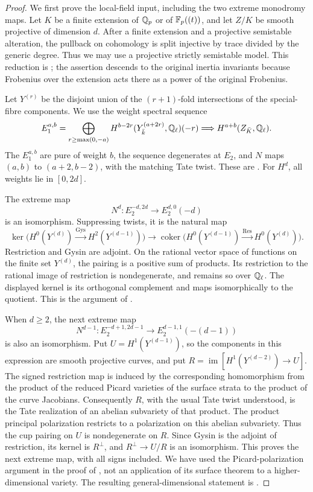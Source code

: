 \begin{proof}
We first prove the local-field input, including the two extreme
monodromy maps.  Let $K$ be a finite extension of $\mathbb Q_p$ or of
$\mathbb F_p((t))$, and let $Z/K$ be smooth projective of dimension $d$.
After a finite extension and a projective semistable alteration,
the pullback on cohomology is split injective by trace divided by
the generic degree.  Thus we may use a projective strictly
semistable model.  This reduction is
\citet[Theorem~6.5, pp.~83--86]{c_dejong1996}; the assertion
descends to the original inertia invariants because Frobenius over
the extension acts there as a power of the original Frobenius.

Let $Y^{(r)}$ be the disjoint union of the $(r+1)$-fold intersections
of the special-fibre components.  We use the weight spectral sequence
\[
 E_1^{a,b}=\bigoplus_{r\geq\max(0,-a)}
 H^{b-2r}(Y^{(a+2r)}_{\bar k},\mathbb Q_\ell)(-r)
 \Longrightarrow H^{a+b}(Z_{\bar K},\mathbb Q_\ell).
\]
The $E_1^{a,b}$ are pure of weight $b$, the sequence degenerates at
$E_2$, and $N$ maps $(a,b)$ to $(a+2,b-2)$, with the matching
Tate twist.  These are
\citet[Satz~2.10 and (2.11), pp.~40--41]{c_rapoportzink1982}.
For $H^d$, all weights lie in $[0,2d]$.

The extreme map
\[
 N^d:E_2^{-d,2d}\longrightarrow E_2^{d,0}(-d)
\]
is an isomorphism.  Suppressing twists, it is the natural map
\[
 \ker\bigl(H^0(Y^{(d)})\xrightarrow{\mathrm{Gys}}
 H^2(Y^{(d-1)})\bigr)
 \longrightarrow
 \operatorname{coker}\bigl(H^0(Y^{(d-1)})
 \xrightarrow{\mathrm{Res}}H^0(Y^{(d)})\bigr).
\]
Restriction and Gysin are adjoint.  On the rational vector space
of functions on the finite set $Y^{(d)}$, the pairing is a positive
sum of products.  Its restriction to the rational image of
restriction is nondegenerate, and remains so over $\mathbb Q_\ell$.
The displayed kernel is its orthogonal complement and maps
isomorphically to the quotient.  This is the argument of
\citet[Proposition~1.5, p.~9]{c_yamamura2026weights}.

When $d\geq2$, the next extreme map
\[
 N^{d-1}:E_2^{-d+1,2d-1}\longrightarrow
 E_2^{d-1,1}(-(d-1))
\]
is also an isomorphism.  Put $U=H^1(Y^{(d-1)})$, so the components
in this expression are smooth projective curves, and put
$R=\operatorname{im}[H^1(Y^{(d-2)})\to U]$.
The signed restriction map is induced by the corresponding
homomorphism from the product of the reduced Picard varieties of
the surface strata to the product of the curve Jacobians.
Consequently $R$, with the usual Tate twist understood, is the
Tate realization of an abelian subvariety of that product.
The product principal polarization restricts to a polarization on
this abelian subvariety.  Thus the cup pairing on $U$ is
nondegenerate on $R$.  Since Gysin is the adjoint of restriction,
its kernel is $R^\perp$, and $R^\perp\to U/R$ is an isomorphism.
This proves the next extreme map, with all signs included.
We have used the Picard-polarization argument in the proof of
\citet[Satz~2.13, pp.~41--43, especially p.~42]{c_rapoportzink1982},
not an application of its surface theorem to a higher-dimensional
variety.  The resulting general-dimensional statement is
\citet[Proposition~1.7, p.~10]{c_yamamura2026weights}.


\end{proof}
